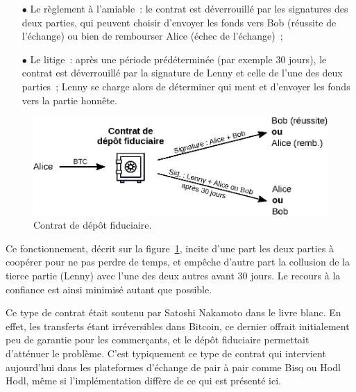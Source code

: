 \begin{itemize}
\item[$\bullet$] Le règlement à l'amiable~: le contrat est déverrouillé par les signatures des deux parties, qui peuvent choisir d'envoyer les fonds vers Bob (réussite de l'échange) ou bien de rembourser Alice (échec de l'échange)~;
\item[$\bullet$] Le litige~: après une période prédéterminée (par exemple 30 jours), le contrat est déverrouillé par la signature de Lenny et celle de l'une des deux parties~; Lenny se charge alors de déterminer qui ment et d'envoyer les fonds vers la partie honnête.
\end{itemize}

\begin{figure}[ht]
  \centering
  \includegraphics[scale=0.9]{img/escrow-contract.eps}
  \caption{Contrat de dépôt fiduciaire.}
  \label{fig:escrow-contract}
\end{figure}

Ce fonctionnement, décrit sur la figure~\ref{fig:escrow-contract}, incite d'une part les deux parties à coopérer pour ne pas perdre de temps, et empêche d'autre part la collusion de la tierce partie (Lenny) avec l'une des deux autres avant 30 jours. Le recours à la confiance est ainsi minimisé autant que possible.

Ce type de contrat était soutenu par Satoshi Nakamoto dans le livre blanc. En effet, les transferts étant irréversibles dans Bitcoin, ce dernier offrait initialement peu de garantie pour les commerçants, et le dépôt fiduciaire permettait d'atténuer le problème. C'est typiquement ce type de contrat qui intervient aujourd'hui dans les plateformes d'échange de pair à pair comme Bisq ou Hodl Hodl, même si l'implémentation diffère de ce qui est présenté ici.

